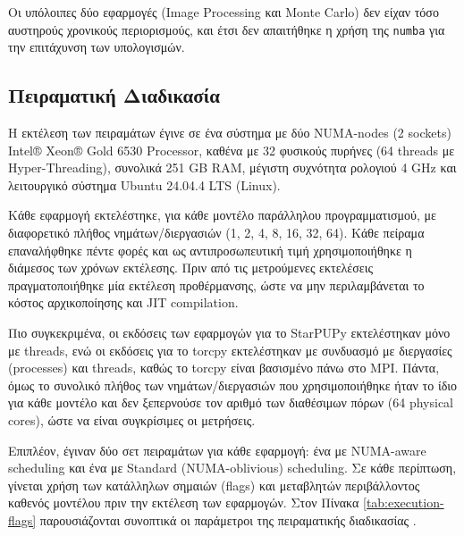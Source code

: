 Οι υπόλοιπες δύο εφαρμογές (Image Processing και Monte Carlo) δεν είχαν τόσο αυστηρούς χρονικούς περιορισμούς, και έτσι δεν απαιτήθηκε η χρήση της \texttt{numba} για την επιτάχυνση των υπολογισμών.

\subsection{Πειραματική Διαδικασία} \label{sec:experiments_setup}

Η εκτέλεση των πειραμάτων έγινε σε ένα σύστημα με δύο NUMA-nodes (2 sockets) Intel® Xeon® Gold 6530 Processor, καθένα με 32 φυσικούς πυρήνες (64 threads με Hyper-Threading), συνολικά 251 GB RAM, μέγιστη συχνότητα ρολογιού 4 GHz και λειτουργικό σύστημα Ubuntu 24.04.4 LTS (Linux). 

Κάθε εφαρμογή εκτελέστηκε, για κάθε μοντέλο παράλληλου προγραμματισμού, με διαφορετικό πλήθος νημάτων/διεργασιών (1, 2, 4, 8, 16, 32, 64). Κάθε πείραμα επαναλήφθηκε πέντε φορές και ως αντιπροσωπευτική τιμή χρησιμοποιήθηκε η διάμεσος των χρόνων εκτέλεσης. Πριν από τις μετρούμενες εκτελέσεις πραγματοποιήθηκε μία εκτέλεση προθέρμανσης, ώστε να μην περιλαμβάνεται το κόστος αρχικοποίησης και JIT compilation.

Πιο συγκεκριμένα, οι εκδόσεις των εφαρμογών για το StarPUPy εκτελέστηκαν μόνο με threads, ενώ οι εκδόσεις για το torcpy εκτελέστηκαν με συνδυασμό με διεργασίες (processes) και threads, καθώς το torcpy είναι βασισμένο πάνω στο MPI. Πάντα, όμως το συνολικό πλήθος των νημάτων/διεργασιών που χρησιμοποιήθηκε ήταν το ίδιο για κάθε μοντέλο και δεν ξεπερνούσε τον αριθμό των διαθέσιμων πόρων (64 physical cores), ώστε να είναι συγκρίσιμες οι μετρήσεις.

Επιπλέον, έγιναν δύο σετ πειραμάτων για κάθε εφαρμογή: ένα με NUMA-aware scheduling και ένα με Standard (NUMA-oblivious) scheduling. Σε κάθε περίπτωση, γίνεται χρήση των κατάλληλων σημαιών (flags) και μεταβλητών περιβάλλοντος καθενός μοντέλου πριν την εκτέλεση των εφαρμογών. Στον Πίνακα \ref{tab:execution-flags} παρουσιάζονται συνοπτικά οι παράμετροι της πειραματικής διαδικασίας \cite{starpu2025handbook,starpu_dev_manual,ibm_torcpy}.

\vspace{1em}

